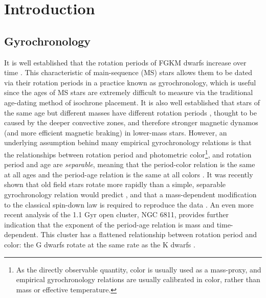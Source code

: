 \section{Introduction}

\subsection{Gyrochronology}
It is well established that the rotation periods of FGKM dwarfs increase over
time \citep{skumanich1972}.
This characteristic of main-sequence (MS) stars allows them to be dated via
their rotation periods in a practice known as gyrochronology, which is useful
since the ages of MS stars are extremely difficult to measure via the
traditional age-dating method of isochrone placement.
It is also well established that stars of the same age but different masses
have different rotation periods , thought to be caused
by the deeper convective zones, and therefore stronger magnetic dynamos (and
more efficient magnetic braking) in lower-mass stars.
However, an underlying assumption behind many empirical gyrochronology
relations is that the relationships between rotation period and photometric
color\footnote{As the directly observable quantity, color is usually used as a
mass-proxy, and empirical gyrochronology relations are usually calibrated in
color, rather than mass or effective temperature.
}, and rotation period and age are {\it separable}, meaning that the
period-color relation is the same at all ages and the period-age relation is
the same at all colors \citep[\eg][]{barnes2003, barnes2007, mamajek2008,
meibom2011, angus2015, angus2019}.
It was recently shown that old field stars rotate more rapidly than a simple,
separable gyrochronology relation would predict \citep{angus2015,
vansaders2016, vansaders2018, metcalfe2019}, and that a mass-dependent
modification to the classical \citet{skumanich1972} spin-down law is required
to reproduce the data \citep{vansaders2016, vansaders2018}.
An even more recent analysis of the 1.1 Gyr open cluster, NGC 6811, provides
further indication that the exponent of the period-age relation is
mass and time-dependent.
This cluster has a flattened relationship between rotation period and color:
the G dwarfs rotate at the same rate as the K dwarfs \citep{curtis2019}.


